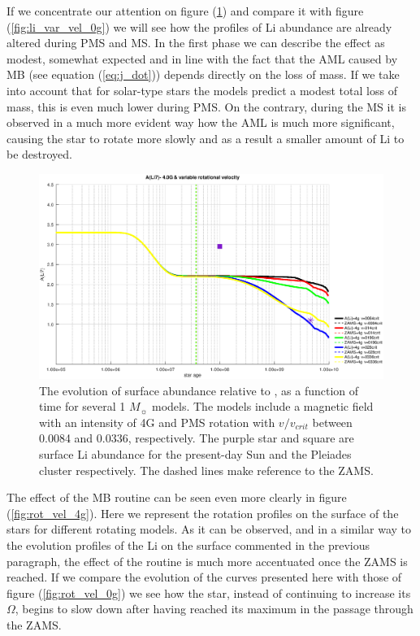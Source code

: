 \documentclass[fleqn,usenatbib]{mnras}
\begin{document}
If we concentrate our attention on figure (\ref{fig:li_var_vel_4_0g}) and compare it with figure (\ref{fig:li_var_vel_0g}) we will see how the profiles of Li abundance are already altered during PMS and MS. In the first phase we can describe the effect as modest, somewhat expected and in line with the fact that the AML caused by MB (see equation (\ref{eq:j_dot})) depends directly on the loss of mass. If we take into account that for solar-type stars the models predict a modest total loss of mass, this is even much lower during PMS. On the contrary, during the MS it is observed in a much more evident way how the AML is much more significant, causing the star to rotate more slowly and as a result a smaller amount of Li to be destroyed.\par

\begin{figure}
	\includegraphics[width=\columnwidth]{figures/li_var_vel_4_0g.eps}
    \caption{The evolution of surface  abundance relative to , as a function of time for several 1 $M_{\sun}$ models. The models include a magnetic field with an intensity of 4G and PMS rotation with $v/v_{crit}$ between 0.0084 and 0.0336, respectively. The purple star and square are surface Li abundance for the present-day Sun \citep{Asplund2009} and the Pleiades cluster \citep{Sestito2005} respectively. The dashed lines make reference to the ZAMS.}
    \label{fig:li_var_vel_4_0g}
\end{figure}

The effect of the MB routine can be seen even more clearly in figure (\ref{fig:rot_vel_4g}). Here we represent the rotation profiles on the surface of the stars for different rotating models. As it can be observed, and in a similar way to the evolution profiles of the Li on the surface commented in the previous paragraph, the effect of the routine is much more accentuated once the ZAMS is reached. If we compare the evolution of the curves presented here with those of figure (\ref{fig:rot_vel_0g}) we see how the star, instead of continuing to increase its $\Omega$, begins to slow down after having reached its maximum in the passage through the ZAMS.\par
\end{document}
